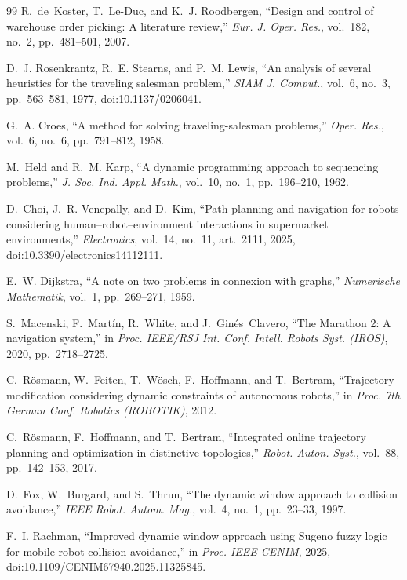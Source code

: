 \documentclass[conference]{IEEEtran}
\begin{document}
\begin{thebibliography}{99}
R.~de~Koster, T.~Le-Duc, and K.~J. Roodbergen, ``Design and control of warehouse order picking: A literature review,'' \emph{Eur. J. Oper. Res.}, vol.~182, no.~2, pp.~481--501, 2007.

D.~J. Rosenkrantz, R.~E. Stearns, and P.~M. Lewis, ``An analysis of several heuristics for the traveling salesman problem,'' \emph{SIAM J. Comput.}, vol.~6, no.~3, pp.~563--581, 1977, doi:10.1137/0206041.

G.~A. Croes, ``A method for solving traveling-salesman problems,'' \emph{Oper. Res.}, vol.~6, no.~6, pp.~791--812, 1958.

M.~Held and R.~M. Karp, ``A dynamic programming approach to sequencing problems,'' \emph{J. Soc. Ind. Appl. Math.}, vol.~10, no.~1, pp.~196--210, 1962.

D.~Choi, J.~R. Venepally, and D.~Kim, ``Path-planning and navigation for robots considering human--robot--environment interactions in supermarket environments,'' \emph{Electronics}, vol.~14, no.~11, art.~2111, 2025, doi:10.3390/electronics14112111.

E.~W. Dijkstra, ``A note on two problems in connexion with graphs,'' \emph{Numerische Mathematik}, vol.~1, pp.~269--271, 1959.

S.~Macenski, F.~Mart\'in, R.~White, and J.~Gin\'es~Clavero, ``The Marathon 2: A navigation system,'' in \emph{Proc. IEEE/RSJ Int. Conf. Intell. Robots Syst. (IROS)}, 2020, pp.~2718--2725.

C.~R\"osmann, W.~Feiten, T.~W\"osch, F.~Hoffmann, and T.~Bertram, ``Trajectory modification considering dynamic constraints of autonomous robots,'' in \emph{Proc. 7th German Conf. Robotics (ROBOTIK)}, 2012.

C.~R\"osmann, F.~Hoffmann, and T.~Bertram, ``Integrated online trajectory planning and optimization in distinctive topologies,'' \emph{Robot. Auton. Syst.}, vol.~88, pp.~142--153, 2017.

D.~Fox, W.~Burgard, and S.~Thrun, ``The dynamic window approach to collision avoidance,'' \emph{IEEE Robot. Autom. Mag.}, vol.~4, no.~1, pp.~23--33, 1997.

F.~I. Rachman, ``Improved dynamic window approach using Sugeno fuzzy logic for mobile robot collision avoidance,'' in \emph{Proc. IEEE CENIM}, 2025, doi:10.1109/CENIM67940.2025.11325845.


\end{thebibliography}
\end{document}
